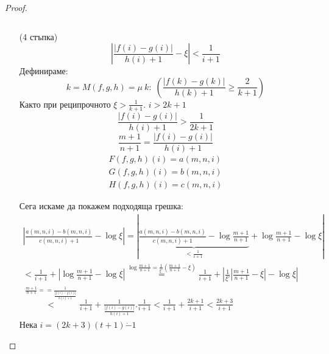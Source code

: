 \begin{proof}
\begin{itemize}
\begin{equation}
        \end{equation}
        \item[(4 стъпка)]
        \begin{equation}
            \left| \frac{|f(i) - g(i)|}{h(i) + 1}- \xi\right| < \frac{1}{i+1}
        \end{equation}
        Дефинираме:
        \begin{equation}
            k = M(f, g, h) = \mu\ k:\; \left(\frac{\left|f(k) - g(k)\right|}{h(k) + 1} \geq \frac{2}{k+1}\right)
        \end{equation}
        Както при реципрочното $\xi > \frac{1}{k+1}$. $i > 2k+1$
        \begin{equation}
            \frac{|f(i) - g(i)|}{h(i) + 1} > \frac{1}{2k+1}
        \end{equation}
        \begin{equation}
            \frac{m+1}{n+1} = \frac{|f(i) - g(i)|}{h(i) + 1}
        \end{equation}
        \begin{eqnarray}
            F(f,g,h)(i) = a(m,n,i) \\
            G(f,g,h)(i) = b(m,n,i) \\
            H(f,g,h)(i) = c(m,n,i)
        \end{eqnarray}

        Сега искаме да покажем подходяща грешка:
        \begin{eqnarray}
            \left|\frac{a(m,n,i) - b(m,n,i)}{c(m,n,i) + 1} - \log\xi\right| = \left|\underbrace{\frac{a(m,n,i) - b(m,n,i)}{c(m,n,i) + 1} - \log\frac{m+1}{n+1}}_{< \frac{1}{i+1}} + \log\frac{m+1}{n+1} - \log\xi \right| \\
            < \frac{1}{i+1} + \left| \log\frac{m+1}{n+1} - \log\xi \right| \overset{\log\frac{m+1}{n+1}=\frac{1}{\xi'}\left(\frac{m+1}{n+1} - \xi\right)}{=} \frac{1}{i+1} + \left| \frac{1}{\xi'}\left|\frac{m+1}{n+1} - \xi\right| - \log \xi\right| \\
            \overset{\frac{m+1}{n+1} = =\frac{1}{\frac{|f(i) - g(i)|}{h(i)+1}}}{<} \frac{1}{i+1} + \frac{1}{\frac{|f(i) - g(i)|}{h(i)+1}} . \frac{1}{i+1} < \frac{1}{i+1} + \frac{2k+1}{i+1} < \frac{2k+3}{i+1}
        \end{eqnarray}
        Нека $i = (2k+3)(t+1) \dot - 1$
    \end{itemize}
\end{proof}


